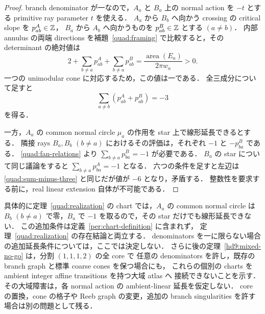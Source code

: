 \begin{proof}
branch denominator が一なので，$A_a$ と $B_a$ 上の normal action を
$-t$ とする primitive ray parameter $t$ を使える．
$A_a$ から $B_b$ へ向かう crossing の critical slope を $p^A_{ab}\in\mathbb Z$，
$B_a$ から $A_b$ へ向かうものを $p^B_{ab}\in\mathbb Z$ とする $(a\ne b)$．
内部 annulus の両端 directions を補題~\ref{quad:framing} で比較すると，その determinant の絶対値は
\[
 2+\sum_{b\ne a}p^A_{ab}+\sum_{b\ne a}p^B_{ab}
 =\frac{\operatorname{area}(E_a)}{2\pi w_a}>0.
\]
一つの unimodular cone に対応するため，この値は一である．
全三成分について足すと
\begin{equation}\label{quad:sum-minus-three}
 \sum_{a\ne b}(p^A_{ab}+p^B_{ab})=-3
\end{equation}
を得る．

一方，$A_a$ の common normal circle $\mu_a$ の作用を star 上で線形延長できるとする．
隣接 rays $B_a,B_b$ $(b\ne a)$ におけるその評価は，それぞれ $-1$ と $-p^B_{ba}$ である．
\eqref{quad:fan-relations} より
$\sum_{b\ne a}p^B_{ba}=-1$ が必要である．
$B_a$ の star について同じ議論をすると $\sum_{b\ne a}p^A_{ba}=-1$ となる．
六つの条件を足すと左辺は \eqref{quad:sum-minus-three} と同じだが値が $-6$ となり，矛盾する．
整数性を要求する前に，real linear extension 自体が不可能である．
\end{proof}

具体的に定理~\ref{quad:realization} の chart では，$A_a$ の common normal circle は
$B_b$ $(b\ne a)$ で零，$B_a$ で $-1$ を取るので，その star だけでも線形延長できない．
この追加条件は定義~\ref{per:chart-definition} に含まれず，
定理~\ref{quad:realization} の存在結論と両立する．
denominators を一に限らない場合の追加延長条件については，ここでは決定しない．
さらに後の定理~\ref{hd9:mixed-no-go} は，分割 $(1,1,1,2)$ の全 core で
任意の denominators を許し，既存の branch graph と標準 coarse cones を保つ場合にも，
これらの個別の charts を ambient integer affine transitions を持つ大域 atlas へ
接続できないことを示す．その大域障害は，各 normal action の ambient-linear 延長を仮定しない．
core の置換，cone の格子や Reeb graph の変更，追加の branch singularities を許す場合は別の問題として残る．
